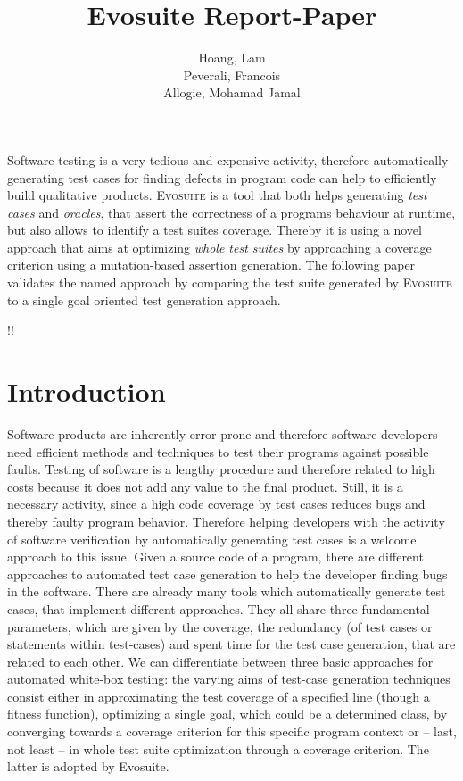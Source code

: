 \documentclass[pdftex,english,oribibl]{llncs}
\title{Evosuite Report-Paper}
\author{Hoang, Lam\\ Peverali, Francois \\ Allogie, Mohamad Jamal}
\institute{Humboldt University of Berlin\\Department of Computer Science\\12489 Berlin, Germany}
\makeatletter
\gdef\@keywords{}
\renewenvironment{abstract}{%
  \list{}{\advance\topsep by0.35cm\relax\small%
          \leftmargin=1cm%
          \labelwidth=\z@%
          \listparindent=\z@%
          \itemindent\listparindent%
          \rightmargin\leftmargin}%
          \item[\hskip\labelsep\bfseries\abstractname]}{%
  \if!\@keywords!\else{\item[~]\item[\hskip\labelsep\bfseries\keywordname]\@keywords}\fi%
  \endlist}
\makeatother
\begin{document}
\maketitle

\begin{abstract}
  Software testing is a very tedious and expensive activity, therefore automatically generating test cases for finding defects in program code can help to efficiently build qualitative products. \textsc{Evosuite} is a tool that both helps generating \textit{test cases} and \textit{oracles}, that assert the correctness of a programs behaviour at runtime, but also allows to identify a test suites coverage. Thereby it is using a novel approach that aims at optimizing \textit{whole test suites} by approaching a coverage criterion using a mutation-based assertion generation. The following paper validates  the named approach by comparing the test suite generated by \textsc{Evosuite} to a single goal oriented test generation approach.
  
\end{abstract}

\section{Introduction}

Software products are inherently error prone and therefore software developers need efficient methods and techniques to test their programs against possible faults. Testing of software is a lengthy procedure and therefore related to high costs because it does not add any value to the final product. Still, it is a necessary activity, since a high code coverage by test cases reduces bugs and thereby faulty program behavior. Therefore helping developers with the activity of software verification by automatically generating test cases is a welcome approach to this issue.
Given a source code of a program, there are different approaches to automated test case generation to help the developer finding bugs in the software. There are already many tools which automatically generate test cases, that implement different approaches. They all share three fundamental parameters, which are given by the coverage, the redundancy (of test cases or statements within test-cases) and spent time for the test case generation, that are related to each other. We can differentiate between three basic approaches for automated white-box testing: the varying aims of test-case generation techniques consist either in approximating the test coverage of a specified line (though a fitness function), optimizing a single goal, which could be a determined class, by converging towards a coverage criterion for this specific program context or -- last, not least -- in whole test suite optimization through a coverage criterion. The latter is adopted by Evosuite. 
 
\end{document}

